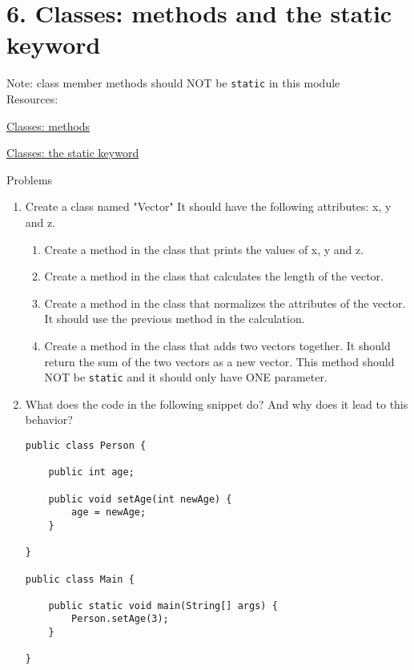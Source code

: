 \documentclass[12pt,letterpaper]{article}
\newcommand\hwnumber{6}
\begin{document}
\section*{\hwnumber. Classes: methods and the static keyword}
Note: class member methods should NOT be \lstinline{static} in this module \\
Resources:
\begin{description}
    \item \href{https://www.w3schools.com/java/java_class_methods.asp}{Classes: methods}
    \item \href{https://www.baeldung.com/java-static}{Classes: the static keyword}
\end{description}


Problems
\begin{enumerate}
\item
Create a class named "Vector" It should have the following attributes: x, y and z.
\begin{enumerate}
\item
Create a method in the class that prints the values of x, y and z.

\item
Create a method in the class that calculates the length of the vector.

\item
Create a method in the class that normalizes the attributes of the vector. It should use the
previous method in the calculation.

\item
Create a method in the class that adds two vectors together. It should return the sum of the two vectors as a new vector.
This method should NOT be \lstinline[]$static$ and it should only have ONE parameter.
\end{enumerate}

\item
What does the code in the following snippet do? And why does it lead to this behavior?
\begin{lstlisting}
public class Person {

    public int age;

    public void setAge(int newAge) {
        age = newAge;
    }

}

public class Main {

    public static void main(String[] args) {
        Person.setAge(3);
    }

}
\end{lstlisting}
\newpage


\end{enumerate}
\end{document}
